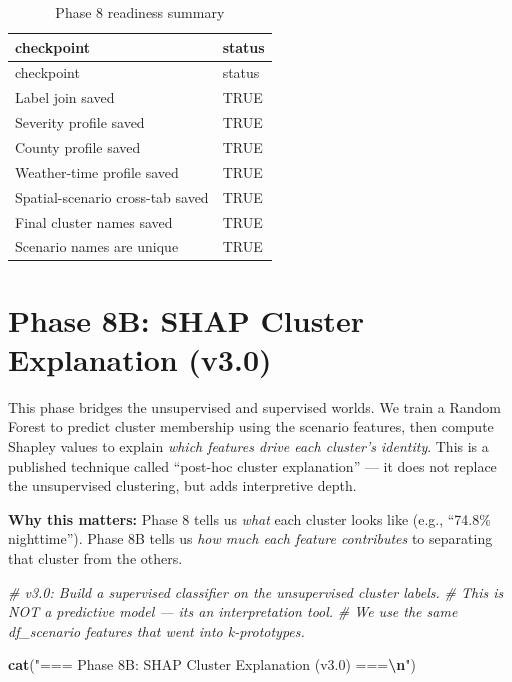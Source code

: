 \documentclass[
]{article}
\newenvironment{Shaded}{\begin{snugshade}}{\end{snugshade}}
\newcommand{\CommentTok}[1]{\textcolor[rgb]{0.56,0.35,0.01}{\textit{#1}}}
\newcommand{\FunctionTok}[1]{\textcolor[rgb]{0.13,0.29,0.53}{\textbf{#1}}}
\newcommand{\NormalTok}[1]{#1}
\newcommand{\SpecialCharTok}[1]{\textcolor[rgb]{0.81,0.36,0.00}{\textbf{#1}}}
\newcommand{\StringTok}[1]{\textcolor[rgb]{0.31,0.60,0.02}{#1}}
\begin{document}
\begin{longtable}[]{@{}ll@{}}
\caption{Phase 8 readiness summary}\tabularnewline
\toprule\noalign{}
checkpoint & status \\
\midrule\noalign{}
\endfirsthead
\toprule\noalign{}
checkpoint & status \\
\midrule\noalign{}
\endhead
\bottomrule\noalign{}
\endlastfoot
Label join saved & TRUE \\
Severity profile saved & TRUE \\
County profile saved & TRUE \\
Weather-time profile saved & TRUE \\
Spatial-scenario cross-tab saved & TRUE \\
Final cluster names saved & TRUE \\
Scenario names are unique & TRUE \\
\end{longtable}

\section{Phase 8B: SHAP Cluster Explanation
(v3.0)}\label{phase-8b-shap-cluster-explanation-v3.0}

This phase bridges the unsupervised and supervised worlds. We train a
Random Forest to predict cluster membership using the scenario features,
then compute Shapley values to explain \emph{which features drive each
cluster's identity}. This is a published technique called ``post-hoc
cluster explanation'' --- it does not replace the unsupervised
clustering, but adds interpretive depth.

\textbf{Why this matters:} Phase 8 tells us \emph{what} each cluster
looks like (e.g., ``74.8\% nighttime''). Phase 8B tells us \emph{how
much each feature contributes} to separating that cluster from the
others.

\begin{Shaded}
\begin{Highlighting}[]
\CommentTok{\# v3.0: Build a supervised classifier on the unsupervised cluster labels.}
\CommentTok{\# This is NOT a predictive model — it\textquotesingle{}s an interpretation tool.}
\CommentTok{\# We use the same df\_scenario features that went into k{-}prototypes.}

\FunctionTok{cat}\NormalTok{(}\StringTok{"=== Phase 8B: SHAP Cluster Explanation (v3.0) ===}\SpecialCharTok{\textbackslash{}n}\StringTok{"}\NormalTok{)}
\end{Highlighting}
\end{Shaded}
\end{document}
